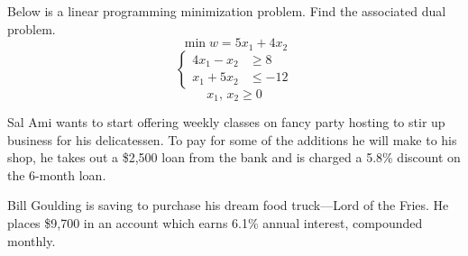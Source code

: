 \documentclass[12pt,letterpaper]{exam}
\begin{document}
\begin{questions}
\newpage
\question[10] Below is a linear programming minimization problem. Find the associated dual problem. 
	\[
	\min w= 5x_1 + 4x_2
	\]
	\[
	\left\{
	\begin{aligned}
	4x_1 - x_2 &\geq 8 \\
	x_1 + 5x_2&\leq -12
	\end{aligned} \right.
	\]
	\[
	x_1,\, x_2 \geq 0
	\]
	


\newpage
\question Sal Ami wants to start offering weekly classes on fancy party hosting to stir up business for his delicatessen. To pay for some of the additions he will make to his shop, he takes out a \$2,500 loan from the bank and is charged a 5.8\% discount on the 6-month loan. \pspace




\newpage
\question Bill Goulding is saving to purchase his dream food truck---Lord of the Fries. He places \$9,700 in an account which earns 6.1\% annual interest, compounded monthly. \pspace 
	
\end{questions}
\end{document}
